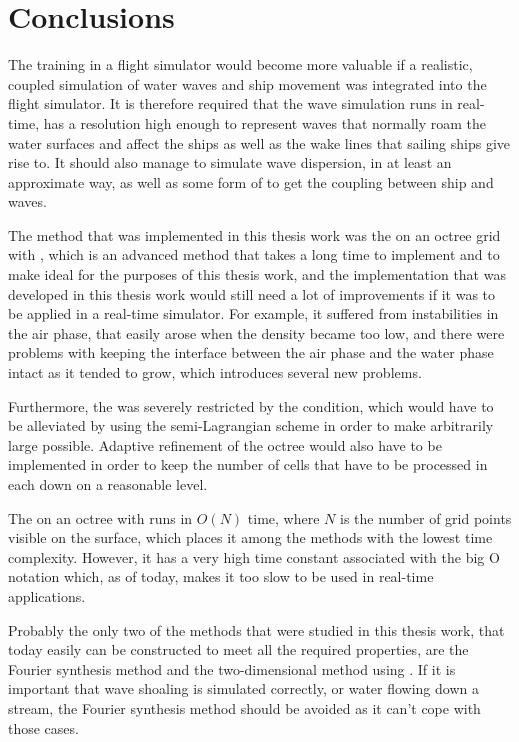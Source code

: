 \chapter{Conclusions}
\label{chap:conclusions}

The training in a flight simulator would become more valuable if a realistic, coupled simulation of water waves and ship movement was integrated into the flight simulator. It is therefore required that the wave simulation runs in real-time, has a resolution high enough to represent waves that normally roam the water surfaces and affect the ships as well as the wake lines that sailing ships give rise to. It should also manage to simulate wave dispersion, in at least an approximate way, as well as some form of \FSI to get the coupling between ship and waves.

The method that was implemented in this thesis work was the \FVM on an octree grid with \FSM, which is an advanced method that takes a long time to implement and to make ideal for the purposes of this thesis work, and the implementation that was developed in this thesis work would still need a lot of improvements if it was to be applied in a real-time simulator. For example, it suffered from instabilities in the air phase, that easily arose when the density became too low, and there were problems with keeping the interface between the air phase and the water phase intact as it tended to grow, which introduces several new problems.

Furthermore, the \timestep was severely restricted by the \CFL condition, which would have to be alleviated by using the semi-Lagrangian scheme in order to make arbitrarily large \timesteps possible. Adaptive refinement of the octree would also have to be implemented in order to keep the number of cells that have to be processed in each \timestep down on a reasonable level.

The \FVM on an octree with \FSM runs in $O(N)$ time, where $N$ is the number of grid points visible on the surface, which places it among the methods with the lowest time complexity. However, it has a very high time constant associated with the big O notation which, as of today, makes it too slow to be used in real-time applications.

Probably the only two of the methods that were studied in this thesis work, that today easily can be constructed to meet all the required properties, are the Fourier synthesis method and the two-dimensional method using \LPD. If it is important that wave shoaling is simulated correctly, or water flowing down a stream, the Fourier synthesis method should be avoided as it can't cope with those cases.

